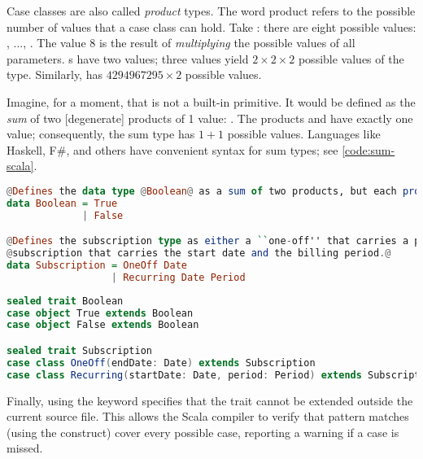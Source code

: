 \documentclass[10 pt]{article}
\begin{document}
Case classes are also called \emph{product} types. The word product refers to the possible number of values that a case class can hold. Take : there are eight possible values: , ..., . The value $8$ is the result of \emph{multiplying} the possible values of all parameters. s have two values; three  values yield $2 \times 2 \times 2$ possible values of the  type. Similarly,  has $4294967295 \times 2$ possible values. 

Imagine, for a moment, that  is not a built-in primitive. It would be defined as the \emph{sum} of two [degenerate] products of 1 value: . The products  and  have exactly one value; consequently, the sum type  has $1 + 1$ possible values. Languages like Haskell\cite{haskell}, F\#\cite{fsharp}, and others have convenient syntax for sum types; see \autoref{code:sum-scala}.

\begin{lstlisting}[label={code:sum-haskell}, language=Haskell, escapechar=@]
@Defines the data type @Boolean@ as a sum of two products, but each product only has one value.@
data Boolean = True   
             | False

@Defines the subscription type as either a ``one-off'' that carries a particular end-date, or a recurring@
@subscription that carries the start date and the billing period.@
data Subscription = OneOff Date 
                  | Recurring Date Period
\end{lstlisting}
\begin{lstlisting}[caption={Sum types}, label={code:sum-scala}, language=Scala, escapechar=|]
sealed trait Boolean
case object True extends Boolean
case object False extends Boolean

sealed trait Subscription
case class OneOff(endDate: Date) extends Subscription
case class Recurring(startDate: Date, period: Period) extends Subscription
\end{lstlisting}

Finally, using the keyword  specifies that the trait cannot be extended outside the current source file. This allows the Scala compiler to verify that pattern matches (using the  construct) cover every possible case, reporting a warning if a case is missed.
\end{document}
